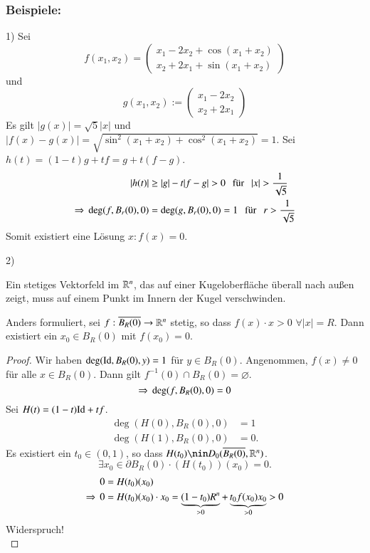 \subsubsection*{Beispiele:}
\begin{description}
    \item{1)}
    Sei 
    \[
        f(x_1,x_2)=\begin{pmatrix} x_1-2x_2+\cos(x_1+x_2)\\x_2+2x_1+\sin(x_1+x_2) \end{pmatrix}
    \]
    und
    \[
        g(x_1,x_2):=\begin{pmatrix} x_1-2x_2 \\ x_2+2x_1 \end{pmatrix}
    \]
    Es gilt $|g(x)|=\sqrt{5} |x|$ und $|f(x)-g(x)|=\sqrt{\sin^2(x_1+x_2)+\cos^2(x_1+x_2)}=1$.
    Sei $h(t)=(1-t)g+tf=g+t(f-g)$.
    \begin{align*}
        |h(t)|&\geq |g|-t|f-g|>0 \qq \text{für} \qq |x|>\frac1{\sqrt{5}}\\
        \Ra \, \deg(f,B_r(0),0)&= \deg(g,B_r(0),0)=1 \qq \text{für} \qq r>\frac1{\sqrt{5}}
    \end{align*}
    Somit existiert eine Lösung $x:f(x)=0$.

    \item{2)}
    \begin{theorem}\label{2.10}
        Ein stetiges Vektorfeld im $\mathbb{R}^n$, das auf einer Kugeloberfläche überall nach außen zeigt, muss
        auf einem Punkt im Innern der Kugel verschwinden. 
        
        Anders formuliert, sei $f:\overline{B_R(0)} \rightarrow \mathbb{R}^n$ stetig, so dass $f(x)\cdot x>0$ $\forall |x|=R$. 
        Dann existiert ein $x_0\in B_R(0)$ mit $f(x_0)=0$.
    \end{theorem}

    \begin{proof}
        Wir haben $\deg(\mathrm{Id}, B_R(0),y)=1$ für $y\in B_R(0)$. Angenommen, $f(x)\neq 0$ für alle
        $x\in B_R(0)$. Dann gilt $f^{-1}(0)\cap B_R(0)=\varnothing$.
        \[
            \Rightarrow \, \deg(f,B_R(0),0)=0
        \]
        Sei $H(t)=(1-t)\mathrm{Id}+tf$.
        \begin{align*}
            \deg(H(0),B_R(0),0)&=1\\
            \deg(H(1),B_R(0),0)&=0.
        \end{align*}
        Es existiert ein $t_0\in (0,1)$, so dass $H(t_0)\nin D_0(\ol{B_R(0)},\R^n)$.
        \[
            \exists x_0\in \partial B_R(0)\cdot (H(t_0))(x_0)=0.
        \]
        \begin{align*}
            0&=H(t_0)(x_0)\\
            \Rightarrow \, 0&= H(t_0)(x_0)\cdot x_0= \underbrace{(1-t_0)R^n}_{>0}+\underbrace{t_0f(x_0)x_0}_{>0}
            >0
        \end{align*}
        Widerspruch!
        \[ \]
    \end{proof}
\end{description}

